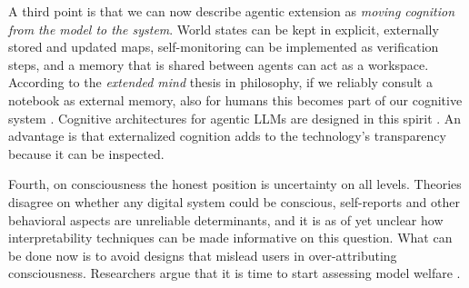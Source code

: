 
A third point is that we can now describe agentic extension as \emph{moving cognition from the model to the system}. World states can be kept in explicit, externally stored and updated maps, self-monitoring can be implemented as verification steps, and a memory that is shared between agents can act as a workspace. According to the \emph{extended mind} thesis in philosophy, if we reliably consult a notebook as external memory, also for humans this becomes part of our cognitive system \citep{clark1998extended}. Cognitive architectures for agentic LLMs are designed in this spirit \citep{sumers2024cognarch}. An advantage is that externalized cognition adds to the technology's transparency because it can be inspected.

Fourth, on consciousness the honest position is uncertainty on all levels. Theories disagree on whether any digital system could be conscious, self-reports and other behavioral aspects are unreliable determinants, and it is as of yet unclear how interpretability techniques can be made informative on this question. What can be done now is to avoid designs that mislead users in over-attributing consciousness. Researchers argue that it is time to start assessing model welfare \citep{butlin2023consciousness,long2024taking}.




